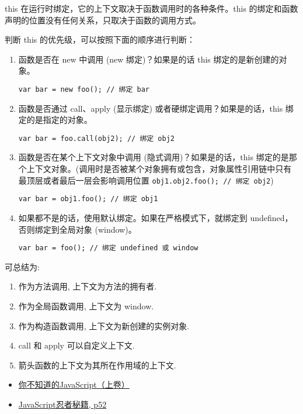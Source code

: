 this 在运行时绑定，它的上下文取决于函数调用时的各种条件。this
的绑定和函数声明的位置没有任何关系，只取决于函数的调用方式。

判断 this 的优先级，可以按照下面的顺序进行判断：

\begin{enumerate}
\def\labelenumi{\arabic{enumi}.}
\item
  函数是否在 new 中调用 (new 绑定)？如果是的话 this
  绑定的是新创建的对象。

\begin{lstlisting}
var bar = new foo(); // 绑定 bar
\end{lstlisting}
\item
  函数是否通过 call、apply (显示绑定) 或者硬绑定调用？如果是的话，this
  绑定的是指定的对象。

\begin{lstlisting}
var bar = foo.call(obj2); // 绑定 obj2
\end{lstlisting}
\item
  函数是否在某个上下文对象中调用 (隐式调用)？如果是的话，this
  绑定的是那个上下文对象。(调用时是否被某个对象拥有或包含，对象属性引用链中只有最顶层或者最后一层会影响调用位置
  \lstinline!obj1.obj2.foo(); // 绑定 obj2!)

\begin{lstlisting}
var bar = obj1.foo(); // 绑定 obj1
\end{lstlisting}
\item
  如果都不是的话，使用默认绑定。如果在严格模式下，就绑定到
  undefined，否则绑定到全局对象 (window)。

\begin{lstlisting}
var bar = foo(); // 绑定 undefined 或 window
\end{lstlisting}
\end{enumerate}

可总结为:

\begin{enumerate}
\def\labelenumi{\arabic{enumi}.}
\tightlist
\item
  作为方法调用, 上下文为方法的拥有者.
\item
  作为全局函数调用, 上下文为 window.
\item
  作为构造函数调用, 上下文为新创建的实例对象.
\item
  call 和 apply 可以自定义上下文.
\item
  箭头函数的上下文为其所在作用域的上下文.
\end{enumerate}

\begin{itemize}
\tightlist
\item
  \href{http://book.douban.com/subject/26351021/}{你不知道的JavaScript（上卷）}
\item
  \href{https://book.douban.com/subject/26638316/}{JavaScript忍者秘籍,
  p52}
\end{itemize}

